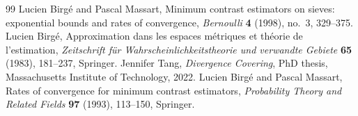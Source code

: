 \documentclass[10pt,a4paper]{amsart}
\begin{document}
\begin{thebibliography}{99}
 Lucien Birg{\'e} and Pascal Massart, Minimum contrast estimators on sieves: exponential bounds and rates of convergence, \emph{Bernoulli} \textbf{4} (1998), no.~3, 329--375.
 Lucien Birg{\'e}, Approximation dans les espaces m{\'e}triques et th{\'e}orie de l'estimation, \emph{Zeitschrift f{\"u}r Wahrscheinlichkeitstheorie und verwandte Gebiete} \textbf{65} (1983), 181--237, Springer.
 Jennifer Tang, \emph{Divergence Covering}, PhD thesis, Massachusetts Institute of Technology, 2022.
 Lucien Birg{\'e} and Pascal Massart, Rates of convergence for minimum contrast estimators, \emph{Probability Theory and Related Fields} \textbf{97} (1993), 113--150, Springer.
\end{thebibliography}
\end{document}
